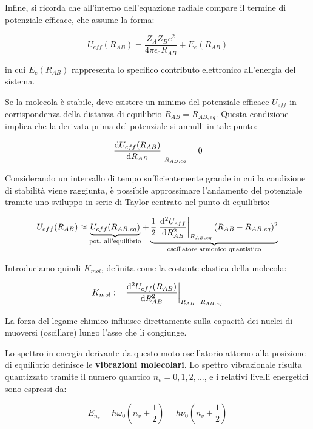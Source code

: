 Infine, si ricorda che all'interno dell'equazione radiale compare il termine di potenziale efficace, che assume la forma:

\begin{equation}
    U_{eff}(R_{AB}) = \frac{Z_A Z_B e^2}{4\pi\epsilon_0 R_{AB}} + E_e(R_{AB})
\end{equation}

in cui \( E_e(R_{AB}) \) rappresenta lo specifico contributo elettronico all'energia del sistema.

Se la molecola è stabile, deve esistere un minimo del potenziale efficace \( U_{eff} \) in corrispondenza della distanza di equilibrio \( R_{AB} = R_{AB,eq} \). Questa condizione implica che la derivata prima del potenziale si annulli in tale punto:

\begin{equation}
    \left. \dv{U_{eff}(R_{AB})}{R_{AB}} \right|_{R_{AB,eq}} = 0
\end{equation}

Considerando un intervallo di tempo sufficientemente grande in cui la condizione di stabilità viene raggiunta, è possibile approssimare l'andamento del potenziale tramite uno sviluppo in serie di Taylor centrato nel punto di equilibrio:

\begin{equation}
    U_{eff}(R_{AB}) \approx \underbrace{U_{eff}(R_{AB,eq})}_{\text{pot. all'equilibrio}} + \underbrace{\frac{1}{2} \left. \dv[2]{U_{eff}}{R_{AB}} \right|_{R_{AB,eq}} (R_{AB} - R_{AB,eq})^2}_{\text{oscillatore armonico quantistico}}
\end{equation}

Introduciamo quindi \( K_{mol} \), definita come la costante elastica della molecola:

\begin{equation}
    K_{mol} := \left. \dv[2]{U_{eff}(R_{AB})}{R_{AB}} \right|_{R_{AB} = R_{AB,eq}}
\end{equation}

La forza del legame chimico influisce direttamente sulla capacità dei nuclei di muoversi (oscillare) lungo l'asse che li congiunge.

Lo spettro in energia derivante da questo moto oscillatorio attorno alla posizione di equilibrio definisce le \textbf{vibrazioni molecolari}.
Lo spettro vibrazionale risulta quantizzato tramite il numero quantico \( n_v = 0, 1, 2, \dots \), e i relativi livelli energetici sono espressi da:

\begin{equation}
    E_{n_v} = \hbar\omega_0 \left( n_v + \frac{1}{2} \right) = h\nu_0 \left( n_v + \frac{1}{2} \right)
\end{equation}

